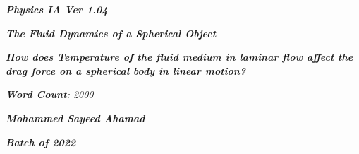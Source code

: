 

\begin{titlepage}
    \begin{center}
        \vspace*{1cm}
            
        \date{}
            
        \huge
            
        \textit{\textbf{Physics IA Ver 1.04}}
            
        \vspace{0.25cm}
            
        \hline
            
        \vspace{2.5cm}
            
        \textit{\textbf{The Fluid Dynamics of a Spherical Object}}
            
        \vspace{1cm}
            
        \LARGE
            
        \textit{\textbf{How does Temperature of the fluid medium in laminar flow affect the drag force on a spherical body in linear motion? }}
            
        \vspace{2.5cm}
            
        \Large
            
		\textit{\textbf{Word Count}: 2000}            

		\vspace{1cm}            
            
		\Large		
		            
        \textit{\textbf{Mohammed Sayeed Ahamad}}
            
        \vspace{2cm}
            
        \Large
            
        \textit{\textbf{Batch of 2022}}
            
        \vspace{0.25cm}
            
        \hline
           
            
    \end{center}
\end{titlepage}




